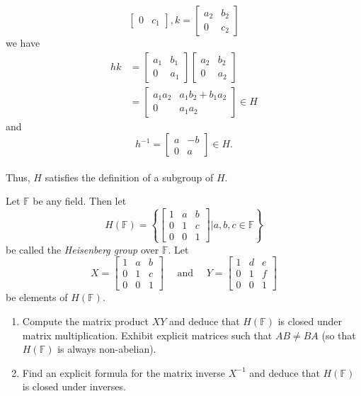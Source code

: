 \documentclass[12 pt, letterpaper]{hmcpset}
\begin{document}
\begin{solution}
\begin{enumerate}
\[\begin{bmatrix}
					0 & c_1
				\end{bmatrix}, k = 
				\begin{bmatrix}
					a_2 & b_2 \\
					0 & c_2
				\end{bmatrix}
			\]
			we have
			\[
				\begin{split}
					hk & = \begin{bmatrix}
						a_1 & b_1 \\
						0 & a_1
					\end{bmatrix}
					\begin{bmatrix}
						a_2 & b_2 \\
						0 & a_2
					\end{bmatrix} \\
					   & = \begin{bmatrix}
						   a_1 a_2 & a_1 b_2 + b_1 a_2 \\
						   0 & a_1 a_2
					   \end{bmatrix} \in H
				\end{split}
			\]
			and
			\[
				h^{-1} = \begin{bmatrix}
					a & -b \\
					0 & a
				\end{bmatrix} \in H.
			\] \\
			Thus, $H$ satisfies the definition of a subgroup of $H$.
	\end{enumerate}
\end{solution}

\pagebreak

\begin{problem}
	Let $\mathbb F$ be any field. Then let
	\[
		H(\mathbb F) = \left \{ \begin{bmatrix}
				1 & a & b \\
				0 & 1 & c \\
				0 & 0 & 1
		\end{bmatrix} | a, b, c \in \mathbb F \right \}
	\]
	be called the \textit{Heisenberg group} over $\mathbb F$. Let
	\[
		X = \begin{bmatrix}
				1 & a & b \\
				0 & 1 & c \\
				0 & 0 & 1
			\end{bmatrix} \quad \text{ and } \quad Y = \begin{bmatrix}
				1 & d & e \\
				0 & 1 & f \\
				0 & 0 & 1
		\end{bmatrix}
	\]
	be elements of $H(\mathbb F)$. 

	\begin{enumerate}
		\item
			Compute the matrix product $XY$ and deduce that $H(\mathbb F)$ is closed under matrix multiplication. Exhibit explicit matrices such that $AB \neq BA$ (so that $H(\mathbb F)$ is always non-abelian).
		\item
			Find an explicit formula for the matrix inverse $X^{-1}$ and deduce that $H(\mathbb F)$ is closed under inverses.
	\end{enumerate}
\end{problem}
\end{document}
